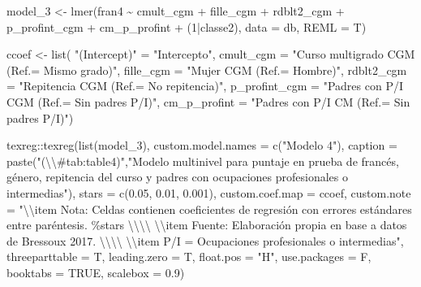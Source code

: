 \documentclass[
  12pt,
  a4paper,
]{article}
\newenvironment{Shaded}{\begin{snugshade}}{\end{snugshade}}
\newcommand{\AttributeTok}[1]{\textcolor[rgb]{0.77,0.63,0.00}{#1}}
\newcommand{\ConstantTok}[1]{\textcolor[rgb]{0.00,0.00,0.00}{#1}}
\newcommand{\DecValTok}[1]{\textcolor[rgb]{0.00,0.00,0.81}{#1}}
\newcommand{\FloatTok}[1]{\textcolor[rgb]{0.00,0.00,0.81}{#1}}
\newcommand{\FunctionTok}[1]{\textcolor[rgb]{0.00,0.00,0.00}{#1}}
\newcommand{\NormalTok}[1]{#1}
\newcommand{\OtherTok}[1]{\textcolor[rgb]{0.56,0.35,0.01}{#1}}
\newcommand{\SpecialCharTok}[1]{\textcolor[rgb]{0.00,0.00,0.00}{#1}}
\newcommand{\StringTok}[1]{\textcolor[rgb]{0.31,0.60,0.02}{#1}}
\begin{document}
\begin{Shaded}
\begin{Highlighting}[]
\NormalTok{model\_3 }\OtherTok{\textless{}{-}} \FunctionTok{lmer}\NormalTok{(fran4 }\SpecialCharTok{\textasciitilde{}}\NormalTok{ cmult\_cgm }\SpecialCharTok{+}\NormalTok{ fille\_cgm }\SpecialCharTok{+} 
\NormalTok{                  rdblt2\_cgm }\SpecialCharTok{+}\NormalTok{ p\_profint\_cgm }\SpecialCharTok{+} 
\NormalTok{                  cm\_p\_profint }\SpecialCharTok{+}\NormalTok{ (}\DecValTok{1}\SpecialCharTok{|}\NormalTok{classe2), }
                \AttributeTok{data =}\NormalTok{ db, }
                \AttributeTok{REML =}\NormalTok{ T)}

\NormalTok{ccoef }\OtherTok{\textless{}{-}} \FunctionTok{list}\NormalTok{(}
  \StringTok{"(Intercept)"} \OtherTok{=} \StringTok{"Intercepto"}\NormalTok{,}
  \AttributeTok{cmult\_cgm =} \StringTok{"Curso multigrado CGM (Ref.= Mismo grado)"}\NormalTok{,}
  \AttributeTok{fille\_cgm =} \StringTok{"Mujer CGM (Ref.= Hombre)"}\NormalTok{,}
  \AttributeTok{rdblt2\_cgm =} \StringTok{"Repitencia CGM (Ref.= No repitencia)"}\NormalTok{,}
  \AttributeTok{p\_profint\_cgm =} \StringTok{"Padres con P/I CGM (Ref.= Sin padres P/I)"}\NormalTok{,}
  \AttributeTok{cm\_p\_profint =} \StringTok{"Padres con P/I CM (Ref.= Sin padres P/I)"}\NormalTok{)}


\NormalTok{texreg}\SpecialCharTok{::}\FunctionTok{texreg}\NormalTok{(}\FunctionTok{list}\NormalTok{(model\_3),}
               \AttributeTok{custom.model.names =} \FunctionTok{c}\NormalTok{(}\StringTok{"Modelo 4"}\NormalTok{),}
               \AttributeTok{caption =} \FunctionTok{paste}\NormalTok{(}\StringTok{"(}\SpecialCharTok{\textbackslash{}\textbackslash{}}\StringTok{\#tab:table4)"}\NormalTok{,}\StringTok{"Modelo multinivel para puntaje en prueba de francés, género, repitencia del curso y padres con ocupaciones profesionales o intermedias"}\NormalTok{),}
               \AttributeTok{stars =} \FunctionTok{c}\NormalTok{(}\FloatTok{0.05}\NormalTok{, }\FloatTok{0.01}\NormalTok{, }\FloatTok{0.001}\NormalTok{),}
               \AttributeTok{custom.coef.map =}\NormalTok{ ccoef,}
               \AttributeTok{custom.note =} \StringTok{"}\SpecialCharTok{\textbackslash{}\textbackslash{}}\StringTok{item Nota: Celdas contienen coeficientes de regresión con errores estándares entre paréntesis. \%stars }\SpecialCharTok{\textbackslash{}\textbackslash{}\textbackslash{}\textbackslash{}}\StringTok{ }\SpecialCharTok{\textbackslash{}\textbackslash{}}\StringTok{item Fuente: Elaboración propia en base a datos de Bressoux 2017. }\SpecialCharTok{\textbackslash{}\textbackslash{}\textbackslash{}\textbackslash{}}\StringTok{ }\SpecialCharTok{\textbackslash{}\textbackslash{}}\StringTok{item P/I = Ocupaciones profesionales o intermedias"}\NormalTok{,}
               \AttributeTok{threeparttable =}\NormalTok{ T,}
               \AttributeTok{leading.zero =}\NormalTok{ T,}
               \AttributeTok{float.pos =} \StringTok{"H"}\NormalTok{,}
               \AttributeTok{use.packages =}\NormalTok{ F,}
               \AttributeTok{booktabs =} \ConstantTok{TRUE}\NormalTok{,}
               \AttributeTok{scalebox =} \FloatTok{0.9}\NormalTok{)}




\end{Highlighting}
\end{Shaded}
\end{document}
